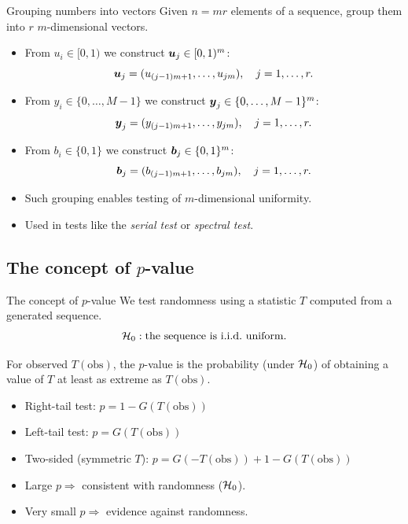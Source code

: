 \documentclass[aspectratio=169]{beamer}
\begin{document}
\begin{frame}{Grouping numbers into vectors}
Given $n = mr$ elements of a sequence, group them into $r$ $m$-dimensional vectors.
\begin{itemize}
 \item  From  $u_i \in [0,1)$ we construct $\mbox{\boldmath$u$}_j \in [0,1)^m$:
\[
\mbox{\boldmath$u$}_j = (u_{(j-1)m+1}, \ldots, u_{jm}), \quad j=1,\ldots,r.
\]

\item  From  $y_i \in \{0,\ldots,M-1\}$ we construct $\mbox{\boldmath$y$}_j \in \{0,\ldots,M-1\}^m$:
\[
\mbox{\boldmath$y$}_j = (y_{(j-1)m+1}, \ldots, y_{jm}), \quad j=1,\ldots,r.
\]
\item From  $b_i \in \{0,1\}$ we construct   $\mbox{\boldmath$b$}_j \in \{0,1\}^m$:
\[
\mbox{\boldmath$b$}_j = (b_{(j-1)m+1}, \ldots, b_{jm}), \quad j=1,\ldots,r.
\]
\end{itemize}

\begin{itemize}
  \item Such grouping enables testing of $m$-dimensional uniformity.
  \item Used in tests like the \textsl{serial test} or \textsl{spectral test}.
\end{itemize}
\end{frame}

\subsection{The concept of $p$-value}

\begin{frame}{The concept of $p$-value}
We test randomness using a statistic \(T\) computed from a generated sequence.
\[
\calH_0: \text{the sequence is i.i.d.\ uniform.}
\]

For observed \(T(\text{obs})\), the $p$-value is the probability (under ${\cal H}_0$)
of obtaining a value of $T$ at least as extreme as $T(\text{obs})$.

\begin{itemize}
 \item Right-tail test: \(p = 1 - G(T(\text{obs}))\)
 \item Left-tail test: \(p = G(T(\text{obs}))\)
 \item Two-sided (symmetric \(T\)): \(p = G(-T(\text{obs})) + 1 - G(T(\text{obs}))\)
\end{itemize}

\medskip
\begin{itemize}
  \item Large $p \Rightarrow$  consistent with randomness (\({\cal H}_0\)).
  \item Very small $p \Rightarrow$  evidence against randomness.
\end{itemize}
\end{frame}
\end{document}
